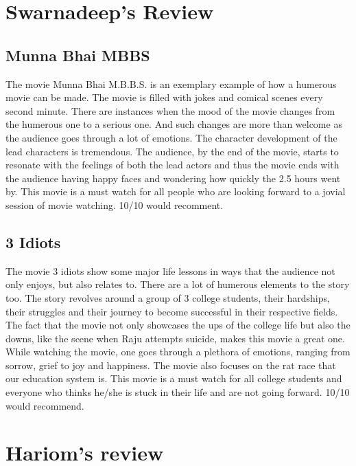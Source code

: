 \documentclass{article}
\begin{document}
\section{Swarnadeep's Review}
\subsection{Munna Bhai MBBS}
The movie Munna Bhai M.B.B.S. is an exemplary example of how a humerous movie can be made. The movie is filled with jokes and comical scenes every second minute. There are instances when the mood of the movie changes from the humerous one to a serious one. And such changes are more than welcome as the audience goes through a lot of emotions. The character development of the lead characters is tremendous. The audience, by the end of the movie, starts to resonate with the feelings of both the lead actors and thus the movie ends with the audience having happy faces and wondering how quickly the 2.5 hours went by. This movie is a must watch for all people who are looking forward to a jovial session of movie watching. 10/10 would recomment. 
\subsection{3 Idiots}
The movie 3 idiots show some major life lessons in ways that the audience not only enjoys, but also relates to. There are a lot of humerous elements to the story too. The story revolves around a group of 3 college students, their hardships, their struggles and their journey to become successful in their respective fields. The fact that the movie not only showcases the ups of the college life but also the downs, like the scene when Raju attempts suicide, makes this movie a great one. While watching the movie, one goes through a plethora of emotions, ranging from sorrow, grief to joy and happiness. The movie also focuses on the rat race that our education system is. This movie is a must watch for all college students and everyone who thinks he/she is stuck in their life and are not going forward. 10/10 would recommend.

\section{Hariom's review}
\end{document}
